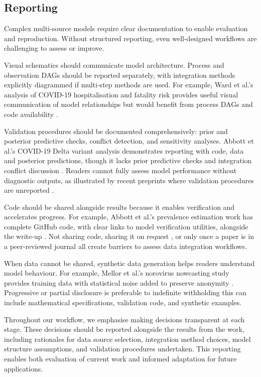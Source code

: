 \documentclass{article}
\begin{document}
\subsection{Reporting} \label{sec:reporting}
Complex multi-source models require clear documentation to enable evaluation and reproduction.
Without structured reporting, even well-designed workflows are challenging to assess or improve.

Visual schematics should communicate model architecture.
Process and observation DAGs should be reported separately, with integration methods explicitly diagrammed if multi-step methods are used.
For example, Ward et al.'s analysis of COVID-19 hospitalisation and fatality risk provides useful visual communication of model relationships but would benefit from process DAGs and code availability \citep{Ward2024-sp}.

Validation procedures should be documented comprehensively: prior and posterior predictive checks, conflict detection, and sensitivity analyses.
Abbott et al.'s COVID-19 Delta variant analysis demonstrates reporting with code, data and posterior predictions, though it lacks prior predictive checks and integration conflict discussion \citep{Abbott2021-delta}.
Readers cannot fully assess model performance without diagnostic outputs, as illustrated by recent preprints where validation procedures are unreported \citep{Fyles2024-qz}.

Code should be shared alongside results because it enables verification and accelerates progress.
For example, Abbott et al.'s prevalence estimation work has complete GitHub code, with clear links to model verification utilities, alongside the write-up \citep{Abbott2022-prevalence}.
Not sharing code, sharing it on request \citep{Ward2024-sp}, or only once a paper is in a peer-reviewed journal \citep{Fyles2024-qz} all create barriers to assess data integration workflows.

When data cannot be shared, synthetic data generation helps readers understand model behaviour.
For example, Mellor et al.'s norovirus nowcasting study provides training data with statistical noise added to preserve anonymity \citep{Mellor2025-norovirus}.
Progressive or partial disclosure is preferable to indefinite withholding this can include mathematical specifications, validation code, and synthetic examples.

Throughout our workflow, we emphasise making decisions transparent at each stage.
These decisions should be reported alongside the results from the work, including rationales for data source selection, integration method choices, model structure assumptions, and validation procedures undertaken.
This reporting enables both evaluation of current work and informed adaptation for future applications.
\end{document}
